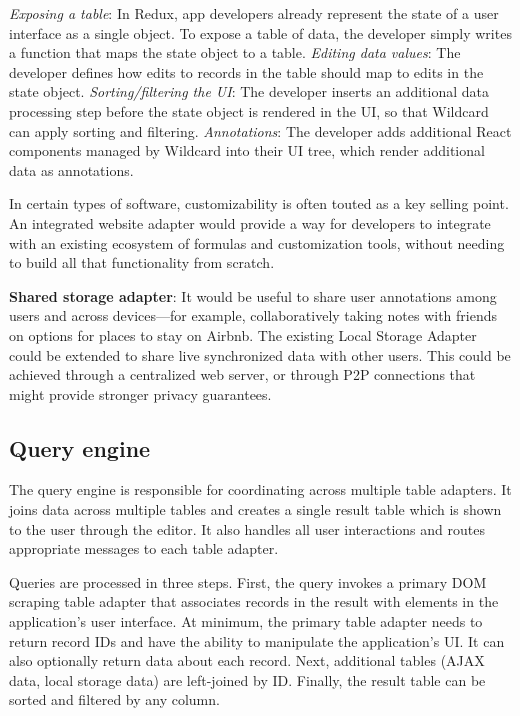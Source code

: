 \documentclass[sigplan,10pt,anonymous,review]{acmart}
\begin{document}
\emph{Exposing a table}: In Redux, app developers already represent the
state of a user interface as a single object. To expose a table of data,
the developer simply writes a function that maps the state object to a
table. \emph{Editing data values}: The developer defines how edits to
records in the table should map to edits in the state object.
\emph{Sorting/filtering the UI}: The developer inserts an additional
data processing step before the state object is rendered in the UI, so
that Wildcard can apply sorting and filtering. \emph{Annotations}: The
developer adds additional React components managed by Wildcard into
their UI tree, which render additional data as annotations.

In certain types of software, customizability is often touted as a key
selling point. An integrated website adapter would provide a way for
developers to integrate with an existing ecosystem of formulas and
customization tools, without needing to build all that functionality
from scratch.

\textbf{Shared storage adapter}: It would be useful to share user
annotations among users and across devices---for example,
collaboratively taking notes with friends on options for places to stay
on Airbnb. The existing Local Storage Adapter could be extended to share
live synchronized data with other users. This could be achieved through
a centralized web server, or through P2P connections that might provide
stronger privacy guarantees.

\hypertarget{query-engine}{%
\subsection{Query engine}\label{query-engine}}

The query engine is responsible for coordinating across multiple table
adapters. It joins data across multiple tables and creates a single
result table which is shown to the user through the editor. It also
handles all user interactions and routes appropriate messages to each
table adapter.

Queries are processed in three steps. First, the query invokes a primary
DOM scraping table adapter that associates records in the result with
elements in the application's user interface. At minimum, the primary
table adapter needs to return record IDs and have the ability to
manipulate the application's UI. It can also optionally return data
about each record. Next, additional tables (AJAX data, local storage
data) are left-joined by ID. Finally, the result table can be sorted and
filtered by any column.
\end{document}
